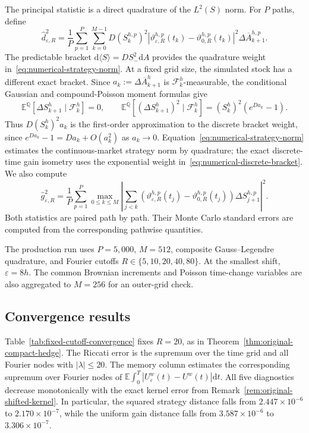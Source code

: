 \documentclass[11pt]{article}
\theoremstyle{definition}
\theoremstyle{remark}
\newcommand{\E}{\mathbb{E}}
\newcommand{\Q}{\mathbb{Q}}
\newcommand{\F}{\mathcal{F}}
\newcommand{\1}{\mathbf{1}}
\newcommand{\dd}{\mathrm{d}}
\begin{document}
The principal statistic is a direct quadrature of the $L^2(S)$ norm. For
$P$ paths, define
\begin{equation}
\label{eq:numerical-strategy-norm}
 \widehat d_{\varepsilon,R}^2
 =\frac1P\sum_{p=1}^P\sum_{k=0}^{M-1}
 D(S_k^{h,p})^2
 \left|\vartheta_{\varepsilon,R}^{h,p}(t_k)
             -\vartheta_{0,R}^{h,p}(t_k)\right|^2
 \Delta\overline A_{k+1}^{h,p}.
\end{equation}
The predictable bracket
$\dd\langle S\rangle=D S_{-}^2\dd A$ provides the quadrature weight
in~\eqref{eq:numerical-strategy-norm}. At a fixed grid size, the simulated
stock has a different exact bracket. Since
$a_k:=\Delta\overline A_{k+1}^h$ is $\F_k^h$-measurable, the conditional
Gaussian and compound-Poisson moment formulas give
\begin{equation}
\label{eq:numerical-discrete-bracket}
 \E^\Q[\Delta S_{k+1}^h\mid\F_k^h]=0,
 \qquad
 \E^\Q[(\Delta S_{k+1}^h)^2\mid\F_k^h]
 =(S_k^h)^2\left(e^{Da_k}-1\right).
\end{equation}
Thus $D(S_k^h)^2a_k$ is the first-order approximation to the discrete
bracket weight, since $e^{Da_k}-1=Da_k+O(a_k^2)$ as $a_k\to0$.
Equation~\eqref{eq:numerical-strategy-norm} estimates the continuous-market
strategy norm by quadrature; the exact discrete-time gain isometry uses
the exponential weight in~\eqref{eq:numerical-discrete-bracket}.
We also compute
\[
 \widehat g_{\varepsilon,R}^2
 =\frac1P\sum_{p=1}^P\max_{0\leq k\leq M}
 \left|\sum_{j<k}
  (\vartheta_{\varepsilon,R}^{h,p}(t_j)
   -\vartheta_{0,R}^{h,p}(t_j))\Delta S_{j+1}^{h,p}\right|^2.
\]
Both statistics are paired path by path. Their Monte Carlo standard errors
are computed from the corresponding pathwise quantities.

The production run uses $P=5{,}000$, $M=512$, composite Gauss--Legendre
quadrature, and Fourier cutoffs $R\in\{5,10,20,40,80\}$. At the smallest
shift, $\varepsilon=8h$. The common Brownian increments and Poisson
time-change variables are also aggregated to $M=256$ for an outer-grid check.

\subsection{Convergence results}

Table~\ref{tab:fixed-cutoff-convergence} fixes $R=20$, as in
Theorem~\ref{thm:original-compact-hedge}. The Riccati error is the supremum
over the time grid and all Fourier nodes with $|\lambda|\leq20$. The memory
column estimates the corresponding supremum over Fourier nodes of
$\E\int_0^T|U_\varepsilon^w(t)-U^w(t)|\dd t$. All five diagnostics decrease
monotonically with the exact kernel error from
Remark~\ref{rem:original-shifted-kernel}. In particular, the squared strategy
distance falls from $2.447\times10^{-6}$ to $2.170\times10^{-7}$, while the
uniform gain distance falls from $3.587\times10^{-6}$ to
$3.306\times10^{-7}$.
\end{document}

